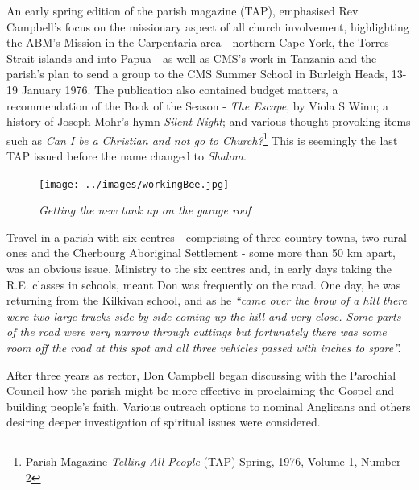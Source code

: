 An early spring edition of the parish magazine (TAP), emphasised Rev Campbell's focus on the missionary aspect of all church involvement, highlighting the ABM's Mission in the Carpentaria area - northern Cape York, the Torres Strait islands and into Papua - as well as CMS's work in Tanzania and the parish's plan to send a group to the CMS Summer School in Burleigh Heads, 13-19 January 1976. The publication also contained budget matters, a recommendation of the Book of the Season - \emph{The Escape}, by Viola S Winn; a history of Joseph Mohr's hymn \emph{Silent Night}; and various thought-provoking items such as \emph{Can I be a Christian and not go to Church?}\footnote{Parish Magazine \emph{Telling All People} (TAP) Spring, 1976, Volume 1, Number 2} This is seemingly the last TAP issued before the name changed to \emph{Shalom}.








\begin{figure}[!htb]
\begin{center}
\texttt{[image: ../images/workingBee.jpg]}
\caption{\itshape Getting the new tank up on the garage roof}
\end{center}
\end{figure}




Travel in a parish with six centres - comprising of three country towns, two rural ones and the Cherbourg Aboriginal Settlement - some more than 50 km apart, was an obvious issue. Ministry to the six centres and, in early days taking the R.E. classes in schools, meant Don was frequently on the road. One day, he was returning from the Kilkivan school, and as he \emph{``came over the brow of a hill there were two large trucks side by side coming up the hill and very close. Some parts of the road were very narrow through cuttings but fortunately there was some room off the road at this spot and all three vehicles passed with inches to spare''.}



After three years as rector, Don Campbell began discussing with the Parochial Council how the parish might be more effective in proclaiming the Gospel and building people's faith. Various outreach options to nominal Anglicans and others desiring deeper investigation of spiritual issues were considered.




